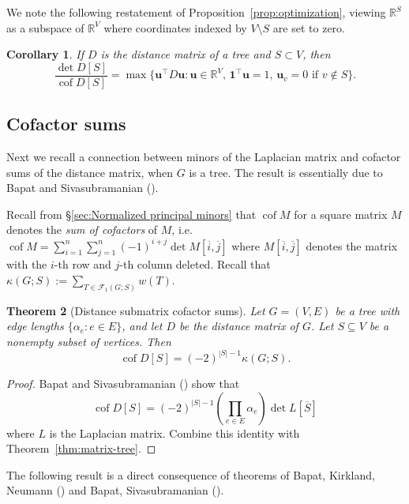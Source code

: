 \documentclass[12pt]{amsart}
\newtheorem{thm}{Theorem}[section]
\newtheorem{cor}[thm]{Corollary}
\theoremstyle{definition}
\newcommand{\RR}{\mathbb{R}}
\newcommand{\bone}{\mathbf{1}}
\newcommand{\boldu}{\mathbf{u}}
\newcommand{\Da}{{D}}
\newcommand{\La}{L}
\newcommand{\tr}{\intercal}
\DeclareMathOperator{\cof}{cof}
\newcommand{\trees}{\mathcal{F}_1}
\begin{document}
We note the following restatement of Proposition~\ref{prop:optimization}, viewing $\RR^S$ as a subspace of $\RR^V$ 
where coordinates indexed by $V \setminus S$ are set to zero.
\begin{cor}
\label{cor:optimization}
If $D$ is the distance matrix of a tree and  $S \subset V$, then
\[
	\frac{\det D[S]}{\cof D[S]} = \max \{\boldu^\tr D \boldu \colon \boldu \in \RR^V,\, \bone^\tr \boldu = 1,\, \boldu_v = 0 \text{ if } v \not\in S \}.
\]
\end{cor}



\subsection{Cofactor sums}

Next we recall a connection between minors of the Laplacian matrix and cofactor sums of the distance matrix, when $G$ is a tree.
The result is essentially due to Bapat and Sivasubramanian (\cite{bapat-sivasubramanian}).

Recall from \S\ref{sec:Normalized principal minors} that $\cof M$ for a square matrix $M$ denotes the {\em sum of cofactors} of $M$, i.e.
$\displaystyle
	\cof M = \sum_{i = 1}^{n} \sum_{j = 1}^{n} (-1)^{i + j} \det M[\overline{i}, \overline{j}]
$
where $M[\overline{i}, \overline{j}]$ denotes the matrix with the $i$-th row and $j$-th column deleted.
Recall that $\kappa(G; S)  :=  \sum_{T \in \trees(G; S)} w(T)$.

\begin{thm}[Distance submatrix cofactor sums]
\label{thm:distance-sub-cof}
Let $G = (V, E)$ be a tree with edge lengths $\{\alpha_e \colon e \in E\}$,
and let $\Da$ be the distance matrix of $G$.
Let $S \subseteq V$ be a nonempty subset of vertices. 
Then
\begin{equation*}
	\cof \Da[S] = (-2)^{|S| - 1} \kappa(G; S) .
\end{equation*}
\end{thm}
\begin{proof}
Bapat and Sivasubramanian (\cite[Theorem 11]{bapat-sivasubramanian})
show that
\[
	\cof \Da[S] = (-2)^{|S|-1} \left( \prod_{e \in E} \alpha_e \right) \det \La[\overline S] 
\]
where $\La$ is the Laplacian matrix.
Combine this identity with Theorem~\ref{thm:matrix-tree}.
\end{proof}

The following result is a direct consequence of theorems of Bapat, Kirkland, Neumann (\cite{bapat-kirkland-neumann}) and Bapat, Sivasubramanian (\cite{bapat-sivasubramanian}).
\end{document}
